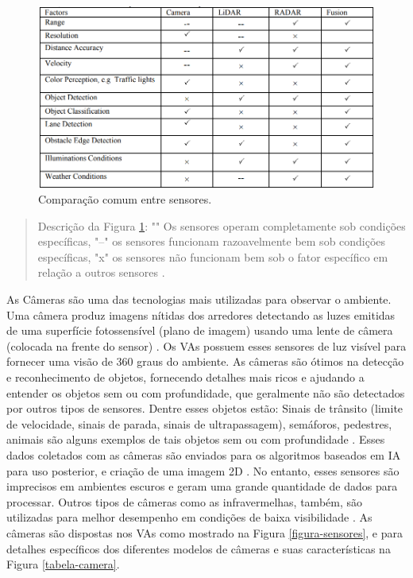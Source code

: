 \begin{figure}[H]
\centering
\includegraphics[width=12cm]{Figures/juncao-table.png}
\caption{Comparação comum entre sensores.}
\label{tabela-juncao}
\end{figure}
\begin{quote}
Descrição da Figura \ref{tabela-juncao}: "\checkmark" Os sensores operam completamente sob condições específicas,
"--" os sensores funcionam razoavelmente bem sob condições específicas, "x" os sensores não funcionam bem sob o fator específico em relação a outros sensores \cite{sensors}.
\end{quote}


As Câmeras são uma das tecnologias mais utilizadas para observar o ambiente. Uma câmera produz imagens nítidas dos arredores detectando as luzes emitidas de uma superfície fotossensível (plano de imagem) usando uma lente de câmera (colocada na frente do sensor) \cite{sensors}. Os VAs possuem esses sensores de luz visível para fornecer uma visão de 360 graus do ambiente. As câmeras são ótimos na detecção e reconhecimento de objetos, fornecendo detalhes mais ricos e ajudando a entender os objetos sem ou com profundidade, que geralmente não são detectados por outros tipos de sensores. Dentre esses objetos estão: Sinais de trânsito (limite de velocidade, sinais de parada, sinais de ultrapassagem), semáforos, pedestres, animais são alguns exemplos de tais objetos sem ou com profundidade \cite{sensors-yet}. Esses dados coletados com as câmeras são enviados para os algoritmos baseados em IA para uso posterior, e criação de uma imagem 2D \cite{aplicacao2}. 
No entanto, esses sensores são imprecisos em ambientes escuros e geram uma grande quantidade de dados para processar. Outros tipos de câmeras como as infravermelhas, também, são utilizadas para melhor desempenho em condições de baixa visibilidade \cite{review-auto}. As câmeras são dispostas nos VAs como mostrado na Figura \ref{figura-sensores}, e para detalhes específicos dos diferentes modelos de câmeras e suas características na Figura \ref{tabela-camera}.

